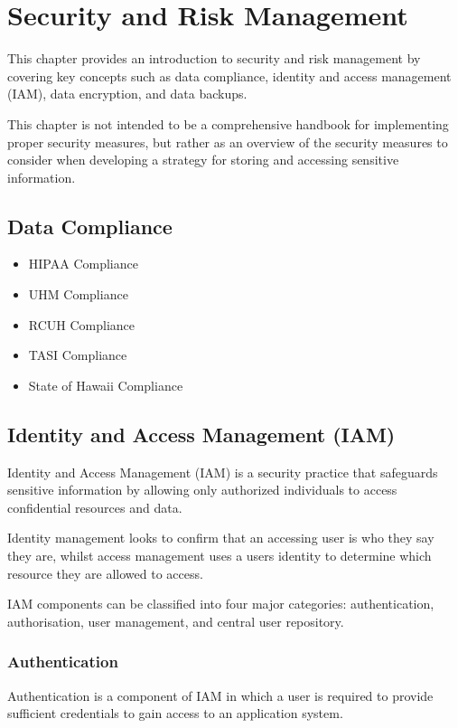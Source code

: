 \section{Security and Risk Management} \label{section: SARM}
This chapter provides an introduction to security and risk management by covering key concepts such as data compliance, identity and access management (IAM), data encryption, and data backups. 

This chapter is not intended to be a comprehensive handbook for implementing proper security measures, but rather as an overview of the security measures to consider when developing a strategy for storing and accessing sensitive information.

\subsection{Data Compliance}

\begin{itemize}
    \item HIPAA Compliance
    \item UHM Compliance
    \item RCUH Compliance
    \item TASI Compliance
    \item State of Hawaii Compliance
\end{itemize}

\subsection{Identity and Access Management (IAM)}
Identity and Access Management (IAM) is a security practice that safeguards sensitive information by allowing only authorized individuals to access confidential resources and data. 

Identity management looks to confirm that an accessing user is who they say they are, whilst access management uses a users identity to determine which resource they are allowed to access. 

IAM components can be classified into four major categories: authentication, authorisation, user management, and central user repository.

\subsubsection{Authentication}
Authentication is a component of IAM in which a user is required to provide sufficient credentials to gain access to an application system. 

